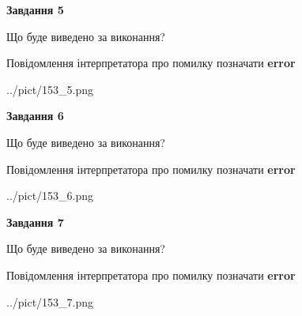 \documentclass[10pt, ukrainian]{article}
\begin{document}
{\begin {large}
{\begin {center}\textbf{Завдання 5}\end {center}}\par
Що буде виведено за виконання? \par
Повідомлення інтерпретатора про помилку позначати \textbf{error}

\begin{center}
	{../pict/153_5.png}
\end{center}
\newpage

{\begin {center}\textbf{Завдання 6}\end {center}}\par
Що буде виведено за виконання? \par
Повідомлення інтерпретатора про помилку позначати \textbf{error}

\begin{center}
	{../pict/153_6.png}
\end{center}
\newpage

{\begin {center}\textbf{Завдання 7}\end {center}}\par
Що буде виведено за виконання? \par
Повідомлення інтерпретатора про помилку позначати \textbf{error}

\begin{center}
	{../pict/153_7.png}
\end{center}
\newpage

\end {large}}
\end{document}
